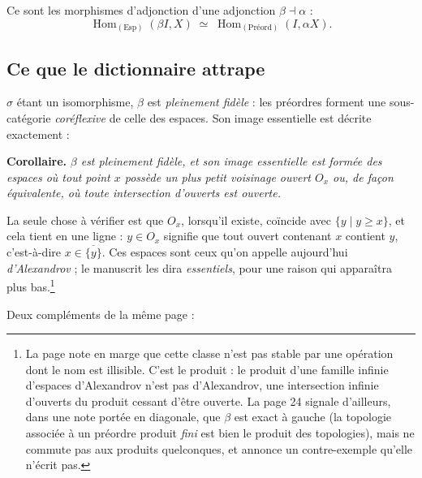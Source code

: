 \documentclass[11pt,a4paper]{article}
\begin{document}
Ce sont les morphismes d'adjonction d'une adjonction $\beta \dashv \alpha$ :
\[
\operatorname{Hom}_{(\mathrm{Esp})}(\beta I, X) \;\simeq\;
\operatorname{Hom}_{(\text{Préord})}(I, \alpha X).
\]

\subsection*{Ce que le dictionnaire attrape}

$\sigma$ étant un isomorphisme, $\beta$ est \emph{pleinement fidèle} : les
préordres forment une sous-catégorie \emph{coréflexive} de celle des espaces.
Son image essentielle est décrite exactement :

\textbf{Corollaire.} \emph{$\beta$ est pleinement fidèle, et son image
essentielle est formée des espaces où tout point $x$ possède un plus petit
voisinage ouvert $O_{x}$ ou, de façon équivalente, où toute intersection
d'ouverts est ouverte.}

La seule chose à vérifier est que $O_{x}$, lorsqu'il existe, coïncide avec
$\{y \mid y \geq x\}$, et cela tient en une ligne : $y \in O_{x}$ signifie que
tout ouvert contenant $x$ contient $y$, c'est-à-dire $x \in \overline{\{y\}}$.
Ces espaces sont ceux qu'on appelle aujourd'hui \emph{d'Alexandrov} ; le
manuscrit les dira \emph{essentiels}, pour une raison qui apparaîtra plus
bas.\footnote{La page note en marge que cette classe n'est pas stable par une
opération dont le nom est illisible. C'est le produit : le produit d'une
famille infinie d'espaces d'Alexandrov n'est pas d'Alexandrov, une
intersection infinie d'ouverts du produit cessant d'être ouverte. La page 24
signale d'ailleurs, dans une note portée en diagonale, que $\beta$ est exact à
gauche (la topologie associée à un préordre produit \emph{fini} est bien le
produit des topologies), mais ne commute pas aux produits quelconques, et
annonce un contre-exemple qu'elle n'écrit pas.}

Deux compléments de la même page :
\end{document}
